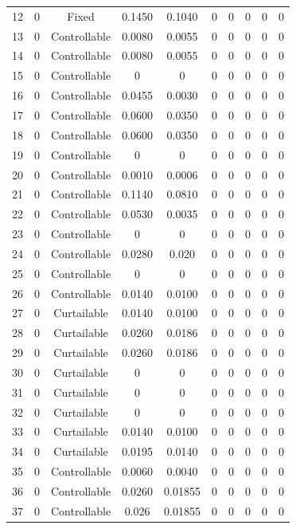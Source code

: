 \begin{longtable}{cccccccccc}
	12 & 0 & Fixed & 0.1450 & 0.1040 & 0 & 0 & 0 & 0 & 0 \\
	13 & 0 & Controllable & 0.0080 & 0.0055 & 0 & 0 & 0 & 0 & 0 \\
	14 & 0 & Controllable & 0.0080 & 0.0055 & 0 & 0 & 0 & 0 & 0 \\
	15 & 0 & Controllable & 0 & 0 & 0 & 0 & 0 & 0 & 0 \\
	16 & 0 & Controllable & 0.0455 & 0.0030 & 0 & 0 & 0 & 0 & 0 \\
	17 & 0 & Controllable & 0.0600 & 0.0350 & 0 & 0 & 0 & 0 & 0 \\
	18 & 0 & Controllable & 0.0600 & 0.0350 & 0 & 0 & 0 & 0 & 0 \\
	19 & 0 & Controllable & 0 & 0 & 0 & 0 & 0 & 0 & 0 \\
	20 & 0 & Controllable & 0.0010 & 0.0006 & 0 & 0 & 0 & 0 & 0 \\
	21 & 0 & Controllable & 0.1140 & 0.0810 & 0 & 0 & 0 & 0 & 0 \\
	22 & 0 & Controllable & 0.0530 & 0.0035 & 0 & 0 & 0 & 0 & 0 \\
	23 & 0 & Controllable & 0 & 0 & 0 & 0 & 0 & 0 & 0 \\
	24 & 0 & Controllable & 0.0280 & 0.020 & 0 & 0 & 0 & 0 & 0 \\
	25 & 0 & Controllable & 0 & 0 & 0 & 0 & 0 & 0 & 0 \\
	26 & 0 & Controllable & 0.0140 & 0.0100 & 0 & 0 & 0 & 0 & 0 \\
	27 & 0 & Curtailable & 0.0140 & 0.0100 & 0 & 0 & 0 & 0 & 0 \\
	28 & 0 & Curtailable & 0.0260 & 0.0186 & 0 & 0 & 0 & 0 & 0 \\
	29 & 0 & Curtailable & 0.0260 & 0.0186 & 0 & 0 & 0 & 0 & 0 \\
	30 & 0 & Curtailable & 0 & 0 & 0 & 0 & 0 & 0 & 0 \\
	31 & 0 & Curtailable & 0 & 0 & 0 & 0 & 0 & 0 & 0 \\
	32 & 0 & Curtailable & 0 & 0 & 0 & 0 & 0 & 0 & 0 \\
	33 & 0 & Curtailable & 0.0140 & 0.0100 & 0 & 0 & 0 & 0 & 0 \\
	34 & 0 & Curtailable & 0.0195 & 0.0140 & 0 & 0 & 0 & 0 & 0 \\
	35 & 0 & Controllable & 0.0060 & 0.0040 & 0 & 0 & 0 & 0 & 0 \\
	36 & 0 & Controllable & 0.0260 & 0.01855 & 0 & 0 & 0 & 0 & 0 \\
	37 & 0 & Controllable & 0.026 & 0.01855 & 0 & 0 & 0 & 0 & 0 \\

\end{longtable}
